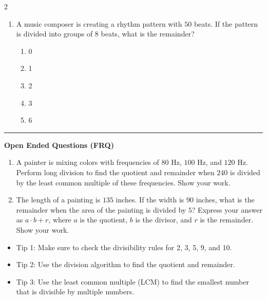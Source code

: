 \documentclass[10pt]{article}
\begin{document}
\begin{multicols}{2}
\begin{enumerate}[label=\textbf{Q\arabic*.}, leftmargin=*, itemsep=6pt, parsep=0pt]
  \item \small A music composer is creating a rhythm pattern with $50$ beats. If the pattern is divided into groups of $8$ beats, what is the remainder?
  \begin{enumerate}[label=(\Alph*), leftmargin=0.6cm, nosep, itemsep=2pt]
    \item 0
    \item 1
    \item 2
    \item 3
    \item 6
  \end{enumerate}

\end{enumerate}
\end{multicols}

\vspace{-0.2cm}
\hrule
\vspace{0.2cm}
\textbf{\small Open Ended Questions (FRQ)}
\begin{enumerate}[label=\textbf{Q\arabic*.}, start=9, itemsep=5pt, topsep=0pt]

  \item \small A painter is mixing colors with frequencies of $80$ Hz, $100$ Hz, and $120$ Hz. Perform long division to find the quotient and remainder when $240$ is divided by the least common multiple of these frequencies. Show your work. \vspace{2cm}

  \item \small The length of a painting is $135$ inches. If the width is $90$ inches, what is the remainder when the area of the painting is divided by $5$? Express your answer as $a \cdot b + r$, where $a$ is the quotient, $b$ is the divisor, and $r$ is the remainder. Show your work. \vspace{2cm}

\end{enumerate}

\vfill

\begin{tcolorbox}[colback=blue!5, colframe=mainblue!50, title=\small \textbf{Chef's Tips}, fonttitle=\bfseries, bottom=1mm]
\begin{itemize}[noitemsep, topsep=2pt, leftmargin=0.5cm]
  \item \scriptsize Tip 1: Make sure to check the divisibility rules for 2, 3, 5, 9, and 10.\item \scriptsize Tip 2: Use the division algorithm to find the quotient and remainder.\item \scriptsize Tip 3: Use the least common multiple (LCM) to find the smallest number that is divisible by multiple numbers.
\end{itemize}
\end{tcolorbox}
\end{document}
